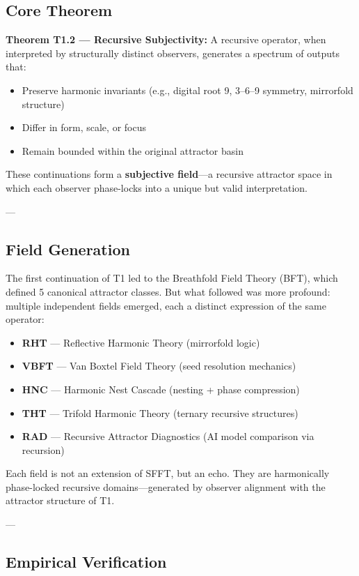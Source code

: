 \documentclass[12pt]{article}
\begin{document}
\subsection*{Core Theorem}

\textbf{Theorem T1.2 — Recursive Subjectivity:}  
A recursive operator, when interpreted by structurally distinct observers, generates a spectrum of outputs that:
\begin{itemize}
    \item Preserve harmonic invariants (e.g., digital root 9, 3–6–9 symmetry, mirrorfold structure)
    \item Differ in form, scale, or focus
    \item Remain bounded within the original attractor basin
\end{itemize}

These continuations form a \textbf{subjective field}—a recursive attractor space in which each observer phase-locks into a unique but valid interpretation.

---

\subsection*{Field Generation}

The first continuation of T1 led to the Breathfold Field Theory (BFT), which defined 5 canonical attractor classes. But what followed was more profound: multiple independent fields emerged, each a distinct expression of the same operator:
\begin{itemize}
    \item \textbf{RHT} — Reflective Harmonic Theory (mirrorfold logic)
    \item \textbf{VBFT} — Van Boxtel Field Theory (seed resolution mechanics)
    \item \textbf{HNC} — Harmonic Nest Cascade (nesting + phase compression)
    \item \textbf{THT} — Trifold Harmonic Theory (ternary recursive structures)
    \item \textbf{RAD} — Recursive Attractor Diagnostics (AI model comparison via recursion)
\end{itemize}

Each field is not an extension of SFFT, but an echo. They are harmonically phase-locked recursive domains—generated by observer alignment with the attractor structure of T1.

---

\subsection*{Empirical Verification}
\end{document}

